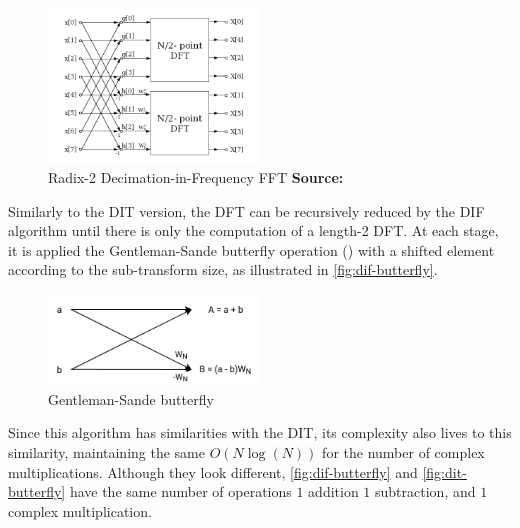 \documentclass[
  oneside,
  11pt, a4paper,
  footinclude=true,
  headinclude=true,
  cleardoublepage=empty
]{scrbook}
\newcommand*{\source}[1]{%
    \textbf{Source:} \cite{#1}%
}
\begin{document}
\begin{figure}[h] 
    \centering
    \includegraphics[width=0.5\textwidth]{img/dif_fft.png}
    \caption{Radix-2 Decimation-in-Frequency FFT \source{jones2014digital}}
    \label{fig:dif-fft}
\end{figure}



Similarly to the DIT version, the DFT can be recursively reduced by the DIF algorithm until there is only the computation of a length-2 DFT. At each stage, it is applied the Gentleman-Sande butterfly operation (\cite{chu1999inside}) with a shifted element according to the sub-transform size, as illustrated in \autoref{fig:dif-butterfly}.


\begin{figure}[h]
    \centering
    \includegraphics[width=0.5\textwidth]{img/dif_butterfly.png}
    \caption{Gentleman-Sande butterfly}
    \label{fig:dif-butterfly}
\end{figure}

Since this algorithm has similarities with the DIT, its complexity also lives to this similarity, maintaining the same \(O(N \log{(N)})\) for the number of complex multiplications. 
Although they look different, \autoref{fig:dif-butterfly} and \autoref{fig:dit-butterfly} have the same number of operations $1$ addition $1$ subtraction, and $1$ complex multiplication.
\end{document}
